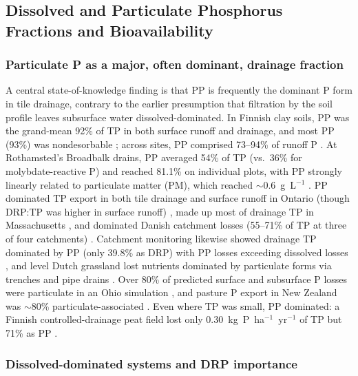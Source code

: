 \subsection{Dissolved and Particulate Phosphorus Fractions and Bioavailability}

\subsubsection{Particulate P as a major, often dominant, drainage fraction}

A central state-of-knowledge finding is that PP is frequently the dominant P form in
tile drainage, contrary to the earlier presumption that filtration by the soil
profile leaves subsurface water dissolved-dominated. In Finnish clay soils, PP was
the grand-mean 92\% of TP in both surface runoff and drainage, and most PP (93\%)
was nondesorbable \parencite{Uusitalo2001}; across sites, PP comprised 73--94\% of
runoff P \parencite{Uusitalo2003}. At Rothamsted's Broadbalk drains, PP averaged 54\%
of TP (vs.\ 36\% for molybdate-reactive P) and reached 81.1\% on individual plots,
with PP strongly linearly related to particulate matter (PM), which reached
$\sim$0.6~g~L$^{-1}$ \parencite{Lu2003,Lu2004}. PP dominated TP export in both tile
drainage and surface runoff in Ontario (though DRP:TP was higher in surface runoff)
\parencite{VanEsbroeck2016}, made up most of drainage TP in Massachusetts
\parencite{Millar2025}, and dominated Danish catchment losses (55--71\% of TP at
three of four catchments) \parencite{Grant1996}. Catchment monitoring likewise showed
drainage TP dominated by PP (only 39.8\% as DRP) with PP losses exceeding dissolved
losses \parencite{Brendel2019}, and level Dutch grassland lost nutrients dominated by
particulate forms via trenches and pipe drains \parencite{vanderSalm2012}. Over 80\%
of predicted surface and subsurface P losses were particulate in an Ohio simulation
\parencite{Askar2021b}, and pasture P export in New Zealand was $\sim$80\%
particulate-associated \parencite{Gillingham2000}. Even where TP was small, PP
dominated: a Finnish controlled-drainage peat field lost only
0.30~kg~P~ha$^{-1}$~yr$^{-1}$ of TP but 71\% as PP \parencite{Pham2023}.

\subsubsection{Dissolved-dominated systems and DRP importance}

